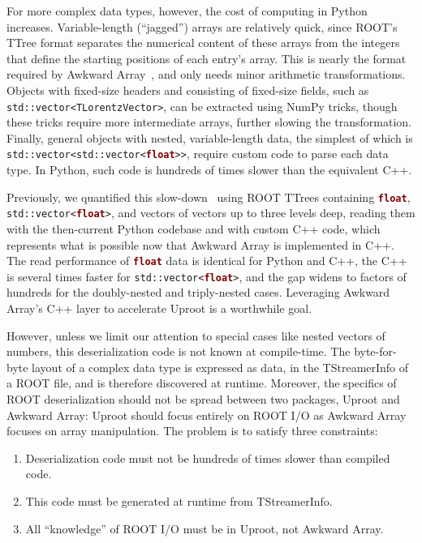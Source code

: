 \documentclass{webofc}
\begin{document}
For more complex data types, however, the cost of computing in Python increases. Variable-length (``jagged'') arrays are relatively quick, since ROOT's TTree format separates the numerical content of these arrays from the integers that define the starting positions of each entry's array. This is nearly the format required by Awkward Array~\cite{awkward}, and only needs minor arithmetic transformations. Objects with fixed-size headers and consisting of fixed-size fields, such as {\tt std::vector<TLorentzVector>}, can be extracted using NumPy tricks, though these tricks require more intermediate arrays, further slowing the transformation. Finally, general objects with nested, variable-length data, the simplest of which is {\tt std::vector<std::vector<\textcolor{Maroon}{\textbf{float}}>{}>}, require custom code to parse each data type. In Python, such code is hundreds of times slower than the equivalent C++.

Previously, we quantified this slow-down~\cite{chep2019} using ROOT TTrees containing \textcolor{Maroon}{\tt\textbf{float}}, {\tt std::vector<\textcolor{Maroon}{\textbf{float}}>}, and vectors of vectors up to three levels deep, reading them with the then-current Python codebase and with custom C++ code, which represents what is possible now that Awkward Array is implemented in C++. The read performance of \textcolor{Maroon}{\tt\textbf{float}} data is identical for Python and C++, the C++ is several times faster for {\tt std::vector<\textcolor{Maroon}{\textbf{float}}>}, and the gap widens to factors of hundreds for the doubly-nested and triply-nested cases. Leveraging Awkward Array's C++ layer to accelerate Uproot is a worthwhile goal.

However, unless we limit our attention to special cases like nested vectors of numbers, this deserialization code is not known at compile-time. The byte-for-byte layout of a complex data type is expressed as data, in the TStreamerInfo of a ROOT file, and is therefore discovered at runtime. Moreover, the specifics of ROOT deserialization should not be spread between two packages, Uproot and Awkward Array: Uproot should focus entirely on ROOT I/O as Awkward Array focuses on array manipulation. The problem is to satisfy three constraints:
\begin{enumerate}
\item Deserialization code must not be hundreds of times slower than compiled code.
\item This code must be generated at runtime from TStreamerInfo.
\item All ``knowledge'' of ROOT I/O must be in Uproot, not Awkward Array.
\end{enumerate}
\end{document}
